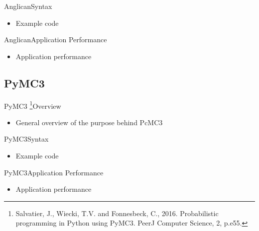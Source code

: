 \documentclass[AERbeamer%
              ,optEnglish%
              ,optBiber%
              ,optBibstyleAlphabetic%
              ,optBeamerClassicFormat%
              ]{AERlatex}%
\begin{document}
\begin{frame}[c]{Anglican}{Syntax}
    \centering
    \begin{itemize}
        \item Example code
    \end{itemize}
\end{frame}


\begin{frame}[c]{Anglican}{Application Performance}
    \centering
    \begin{itemize}
        \item Application performance
    \end{itemize}
\end{frame}


\subsection{PyMC3}
\begin{frame}[c]{PyMC3 \footnote{Salvatier, J., Wiecki, T.V. and Fonnesbeck, C., 2016. Probabilistic programming
                                 in Python using PyMC3. PeerJ Computer Science, 2, p.e55.}}{Overview}
    \centering
    \begin{itemize}
        \item General overview of the purpose behind PcMC3
    \end{itemize}
\end{frame}


\begin{frame}[c]{PyMC3}{Syntax}
    \centering
    \begin{itemize}
        \item Example code
    \end{itemize}
\end{frame}


\begin{frame}[c]{PyMC3}{Application Performance}
    \centering
    \begin{itemize}
        \item Application performance
    \end{itemize}
\end{frame}
\end{document}
